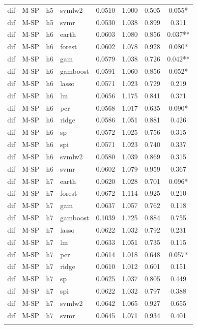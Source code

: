 \begin{ThreePartTable}
\begin{longtable}[t]{llclcccc}
dif & M-SP & h5 & svmlw2 & 0.0510 & 1.000 & 0.505 & 0.055*\\
dif & M-SP & h5 & svmr & 0.0530 & 1.038 & 0.899 & 0.311\\
\addlinespace
dif & M-SP & h6 & earth & 0.0603 & 1.080 & 0.856 & 0.037**\\
dif & M-SP & h6 & forest & 0.0602 & 1.078 & 0.928 & 0.080*\\
dif & M-SP & h6 & gam & 0.0579 & 1.038 & 0.726 & 0.042**\\
dif & M-SP & h6 & gamboost & 0.0591 & 1.060 & 0.856 & 0.052*\\
dif & M-SP & h6 & lasso & 0.0571 & 1.023 & 0.729 & 0.219\\
dif & M-SP & h6 & lm & 0.0656 & 1.175 & 0.841 & 0.371\\
dif & M-SP & h6 & pcr & 0.0568 & 1.017 & 0.635 & 0.090*\\
dif & M-SP & h6 & ridge & 0.0586 & 1.051 & 0.881 & 0.426\\
dif & M-SP & h6 & sp & 0.0572 & 1.025 & 0.756 & 0.315\\
dif & M-SP & h6 & spi & 0.0571 & 1.023 & 0.740 & 0.337\\
dif & M-SP & h6 & svmlw2 & 0.0580 & 1.039 & 0.869 & 0.315\\
dif & M-SP & h6 & svmr & 0.0602 & 1.079 & 0.959 & 0.367\\
\addlinespace
dif & M-SP & h7 & earth & 0.0620 & 1.028 & 0.701 & 0.096*\\
dif & M-SP & h7 & forest & 0.0672 & 1.114 & 0.925 & 0.210\\
dif & M-SP & h7 & gam & 0.0637 & 1.057 & 0.762 & 0.118\\
dif & M-SP & h7 & gamboost & 0.1039 & 1.725 & 0.884 & 0.755\\
dif & M-SP & h7 & lasso & 0.0622 & 1.032 & 0.792 & 0.231\\
dif & M-SP & h7 & lm & 0.0633 & 1.051 & 0.735 & 0.115\\
dif & M-SP & h7 & pcr & 0.0614 & 1.018 & 0.648 & 0.057*\\
dif & M-SP & h7 & ridge & 0.0610 & 1.012 & 0.601 & 0.151\\
dif & M-SP & h7 & sp & 0.0625 & 1.037 & 0.805 & 0.449\\
dif & M-SP & h7 & spi & 0.0622 & 1.032 & 0.797 & 0.388\\
dif & M-SP & h7 & svmlw2 & 0.0642 & 1.065 & 0.927 & 0.655\\
dif & M-SP & h7 & svmr & 0.0645 & 1.071 & 0.934 & 0.401\\
\addlinespace

\end{longtable}
\end{ThreePartTable}
